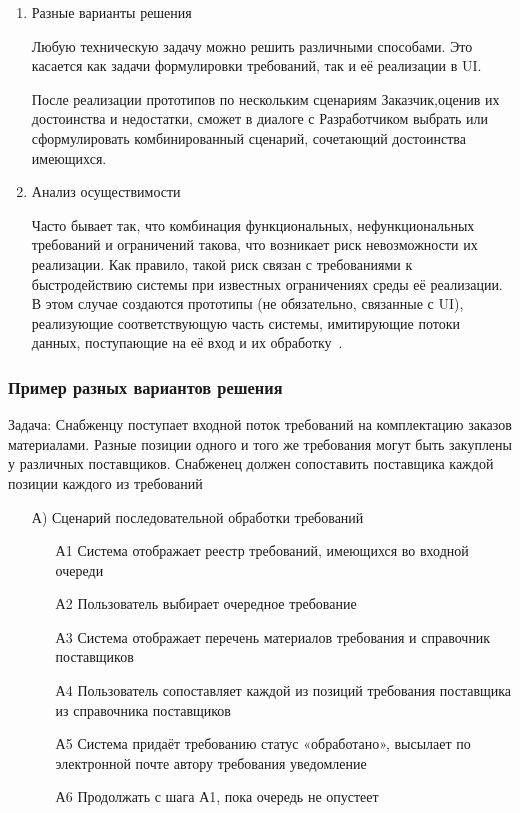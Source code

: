 \documentclass{../industrial-development}
\begin{document}
{\begin{enumerate}
\item \alert{Разные варианты решения}

Любую техническую задачу можно решить различными способами. Это касается как задачи формулировки требований, так и её реализации в UI.

После реализации прототипов по нескольким сценариям Заказчик,оценив их достоинства и недостатки, сможет в диалоге с Разработчиком выбрать или сформулировать комбинированный сценарий, сочетающий достоинства имеющихся.

\item \alert{Анализ осуществимости}

Часто бывает так, что комбинация функциональных, нефункциональных требований и ограничений такова, что возникает риск невозможности
их реализации. Как правило, такой риск связан с требованиями к быстродействию системы при известных ограничениях среды её реализации. В этом случае создаются прототипы (не обязательно, связанные с UI), реализующие соответствующую часть системы, имитирующие потоки данных, поступающие на её вход и их обработку~\cite[с.~51-52]{Maglinec}.

\end{enumerate}

\begin{frame} \frametitle {Пример разных вариантов решения}
\alert{Задача}: Снабженцу поступает входной поток требований на комплектацию заказов материалами. Разные позиции одного и того же требования могут быть закуплены у различных поставщиков. Снабженец должен сопоставить поставщика каждой позиции каждого из требований

\begin{itemize}
\item[А)] Сценарий последовательной обработки требований
\begin{itemize}
\item[А1] Система отображает реестр требований, имеющихся во входной очереди
\item[А2] Пользователь выбирает очередное требование
\item[А3] Система отображает перечень материалов требования и справочник
поставщиков
\item[А4] Пользователь сопоставляет каждой из позиций требования поставщика из справочника поставщиков
\item[А5] Система придаёт требованию статус «обработано», высылает по электронной почте автору требования уведомление
\item[А6] Продолжать с шага А1, пока очередь не опустеет
\end{itemize}
\end{itemize}
\end{frame}

}
\end{document}
